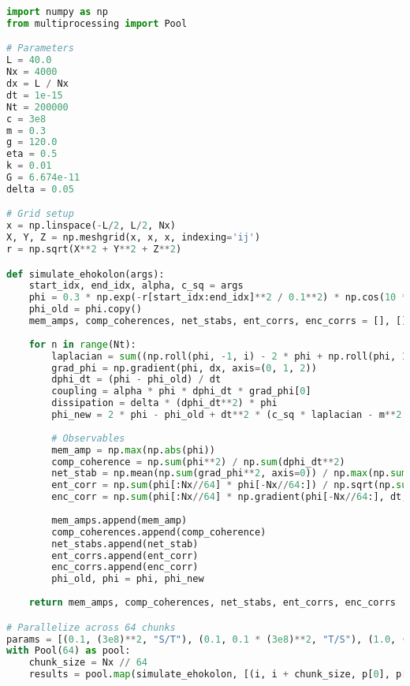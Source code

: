 \documentclass[11pt]{article}
\begin{document}
\begin{lstlisting}[language=Python, caption={Fluxonic Memory and Computation Simulation}, label=lst:simulation]
import numpy as np
from multiprocessing import Pool

# Parameters
L = 40.0
Nx = 4000
dx = L / Nx
dt = 1e-15
Nt = 200000
c = 3e8
m = 0.3
g = 120.0
eta = 0.5
k = 0.01
G = 6.674e-11
delta = 0.05

# Grid setup
x = np.linspace(-L/2, L/2, Nx)
X, Y, Z = np.meshgrid(x, x, x, indexing='ij')
r = np.sqrt(X**2 + Y**2 + Z**2)

def simulate_ehokolon(args):
    start_idx, end_idx, alpha, c_sq = args
    phi = 0.3 * np.exp(-r[start_idx:end_idx]**2 / 0.1**2) * np.cos(10 * X[start_idx:end_idx]) + 0.1 * np.random.rand(Nx//64, Nx, Nx)
    phi_old = phi.copy()
    mem_amps, comp_coherences, net_stabs, ent_corrs, enc_corrs = [], [], [], [], []
    
    for n in range(Nt):
        laplacian = sum((np.roll(phi, -1, i) - 2 * phi + np.roll(phi, 1, i)) / dx**2 for i in range(3))
        grad_phi = np.gradient(phi, dx, axis=(0, 1, 2))
        dphi_dt = (phi - phi_old) / dt
        coupling = alpha * phi * dphi_dt * grad_phi[0]
        dissipation = delta * (dphi_dt**2) * phi
        phi_new = 2 * phi - phi_old + dt**2 * (c_sq * laplacian - m**2 * phi - g * phi**3 - eta * phi**5 + coupling - dissipation)
        
        # Observables
        mem_amp = np.max(np.abs(phi))
        comp_coherence = np.sum(phi**2) / np.sum(dphi_dt**2)
        net_stab = np.mean(np.sum(grad_phi**2, axis=0)) / np.max(np.sum(grad_phi**2, axis=0))
        ent_corr = np.sum(phi[:Nx//64] * phi[-Nx//64:]) / np.sqrt(np.sum(phi[:Nx//64]**2) * np.sum(phi[-Nx//64:]**2))
        enc_corr = np.sum(phi[:Nx//64] * np.gradient(phi[-Nx//64:], dt, axis=0)) / np.sqrt(np.sum(phi[:Nx//64]**2) * np.sum(np.gradient(phi[-Nx//64:], dt, axis=0)**2))
        
        mem_amps.append(mem_amp)
        comp_coherences.append(comp_coherence)
        net_stabs.append(net_stab)
        ent_corrs.append(ent_corr)
        enc_corrs.append(enc_corr)
        phi_old, phi = phi, phi_new
    
    return mem_amps, comp_coherences, net_stabs, ent_corrs, enc_corrs

# Parallelize across 64 chunks
params = [(0.1, (3e8)**2, "S/T"), (0.1, 0.1 * (3e8)**2, "T/S"), (1.0, (3e8)**2, "S=T")]
with Pool(64) as pool:
    chunk_size = Nx // 64
    results = pool.map(simulate_ehokolon, [(i, i + chunk_size, p[0], p[1]) for i in range(0, Nx, chunk_size) for p in params])
\end{lstlisting}
\end{document}
